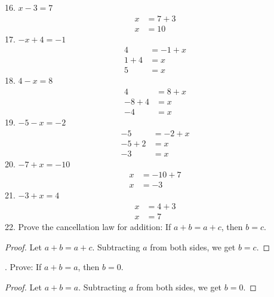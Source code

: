 \documentclass[12pt]{article}
\begin{document}
16. $x-3=7$
\begin{align*}
x&=7+3 \\
x&=10
\end{align*}
17. $-x+4=-1$
\begin{align*}
4&=-1+x \\
1+4&=x \\
5&=x
\end{align*}
18. $4-x=8$
\begin{align*}
4&=8+x \\
-8+4&=x \\
-4&=x
\end{align*}
19. $-5-x=-2$
\begin{align*}
-5&=-2+x \\
-5+2&=x \\
-3&=x
\end{align*}
20. $-7+x=-10$
\begin{align*}
x&=-10+7 \\
x&=-3
\end{align*}
21. $-3+x=4$
\begin{align*}
x&=4+3 \\
x&=7
\end{align*}
22. Prove the cancellation law for addition: If $a+b=a+c$, then $b=c$.
\begin{proof}
Let $a+b=a+c$. Subtracting $a$ from both sides, we get $b=c$.
\end{proof}
. Prove: If $a+b=a$, then $b=0$.
\begin{proof}
Let $a+b=a$. Subtracting $a$ from both sides, we get $b=0$.
\end{proof}
\end{document}
